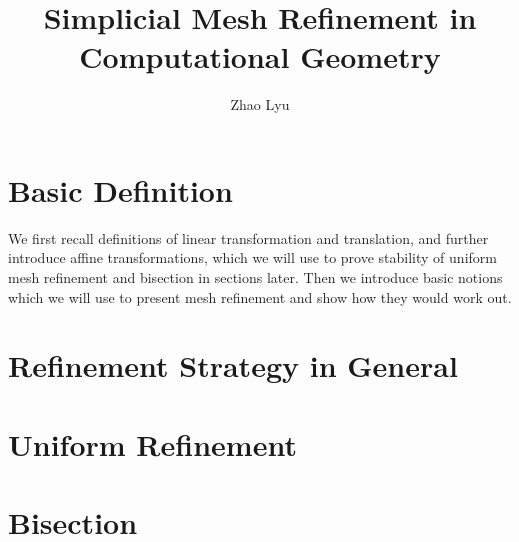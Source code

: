 \documentclass[english]{article}
\begin{document}
  \doublespacing %
  \title{\textbf{Simplicial Mesh Refinement in Computational Geometry}}
  \author{Zhao Lyu}
  \maketitle
  \singlespacing

  \newpage %
  \tableofcontents
  \newpage


  \section{Basic Definition}
    We first recall definitions of linear transformation and translation, and further introduce affine transformations, which we will use to prove stability of uniform mesh refinement and bisection in sections later. Then we introduce basic notions which we will use to present mesh refinement and show how they would work out.

    
    
    
    


  \section{Refinement Strategy in General}
    

  \section{Uniform Refinement}
    

  \section{Bisection}
    

  \newpage
  
  
    
\end{document}
